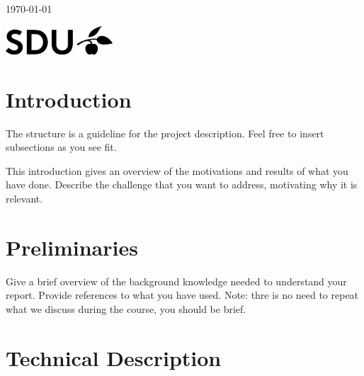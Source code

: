 \documentclass[a4paper,12pt]{article}
\begin{document}
\begin{titlepage}

	\vfill\vfill\vfill %

	{\large \today}


	\vfill\vfill
	\begin{centering}
	\includegraphics[width=0.3\textwidth]{SDU_logo}\\[1cm]
	\end{centering}
	

	\vfill %

\end{titlepage}


\section{Introduction}

The structure is a guideline for the project description. Feel free to insert 
subsections as you
see fit.

This introduction gives an overview of the motivations and results of what you 
have
done. Describe the challenge that you want to address, motivating why it is
relevant.


\section{Preliminaries}

Give a brief overview of the background knowledge needed to understand your
report. Provide references to what you have used. Note: thre is no need to
repeat what we discuss during the course, you should be brief.

\section{Technical Description}
\end{document}

